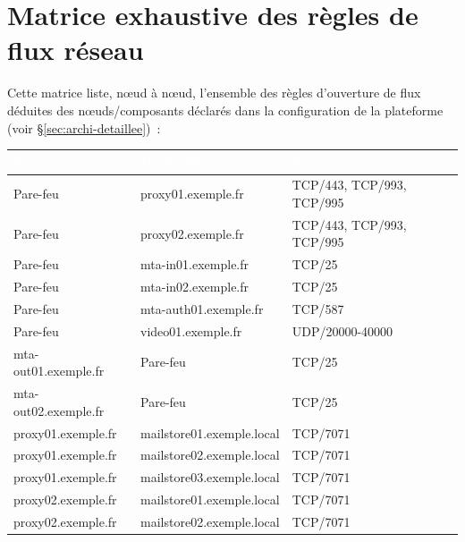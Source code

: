 \documentclass[11pt,a4paper]{report}
\newcommand{\tblhead}[1]{\textcolor{white}{\textbf{#1}}}
\begin{document}
\chapter{Matrice exhaustive des règles de flux réseau}
Cette matrice liste, nœud à nœud, l'ensemble des règles d'ouverture de flux déduites des nœuds/composants déclarés dans la configuration de la plateforme (voir \S\ref{sec:archi-detaillee})~:

\begin{longtable}{|p{5cm}|p{5cm}|p{5cm}|}
\hline
\rowcolor{primary}\tblhead{Source} & \tblhead{Destination} & \tblhead{Port(s)} \\
\hline
\endhead
Pare-\allowbreak{}feu & proxy01.\allowbreak{}exemple.\allowbreak{}fr & TCP/443, TCP/993, TCP/995 \\
\hline
Pare-\allowbreak{}feu & proxy02.\allowbreak{}exemple.\allowbreak{}fr & TCP/443, TCP/993, TCP/995 \\
\hline
Pare-\allowbreak{}feu & mta-\allowbreak{}in01.\allowbreak{}exemple.\allowbreak{}fr & TCP/25 \\
\hline
Pare-\allowbreak{}feu & mta-\allowbreak{}in02.\allowbreak{}exemple.\allowbreak{}fr & TCP/25 \\
\hline
Pare-\allowbreak{}feu & mta-\allowbreak{}auth01.\allowbreak{}exemple.\allowbreak{}fr & TCP/587 \\
\hline
Pare-\allowbreak{}feu & video01.\allowbreak{}exemple.\allowbreak{}fr & UDP/20000-\allowbreak{}40000 \\
\hline
mta-\allowbreak{}out01.\allowbreak{}exemple.\allowbreak{}fr & Pare-\allowbreak{}feu & TCP/25 \\
\hline
mta-\allowbreak{}out02.\allowbreak{}exemple.\allowbreak{}fr & Pare-\allowbreak{}feu & TCP/25 \\
\hline
proxy01.\allowbreak{}exemple.\allowbreak{}fr & mailstore01.\allowbreak{}exemple.\allowbreak{}local & TCP/7071 \\
\hline
proxy01.\allowbreak{}exemple.\allowbreak{}fr & mailstore02.\allowbreak{}exemple.\allowbreak{}local & TCP/7071 \\
\hline
proxy01.\allowbreak{}exemple.\allowbreak{}fr & mailstore03.\allowbreak{}exemple.\allowbreak{}local & TCP/7071 \\
\hline
proxy02.\allowbreak{}exemple.\allowbreak{}fr & mailstore01.\allowbreak{}exemple.\allowbreak{}local & TCP/7071 \\
\hline
proxy02.\allowbreak{}exemple.\allowbreak{}fr & mailstore02.\allowbreak{}exemple.\allowbreak{}local & TCP/7071 \\

\end{longtable}
\end{document}
